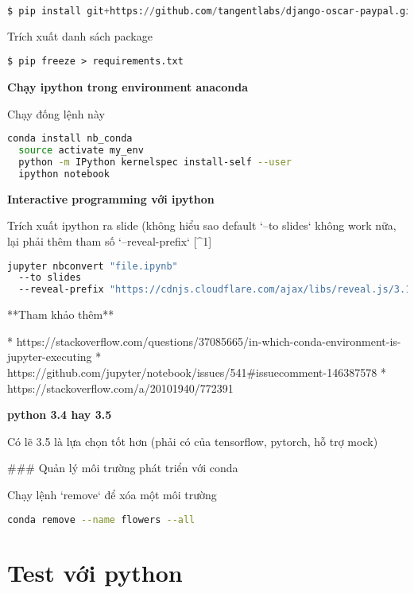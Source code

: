 \begin{lstlisting}[language=Python]
$ pip install git+https://github.com/tangentlabs/django-oscar-paypal.git@issue/34/oscar-0.6#egg=django-oscar-paypal
\end{lstlisting}

\noindent Trích xuất danh sách package

\begin{lstlisting}
$ pip freeze > requirements.txt
\end{lstlisting}

\noindent \textbf{Chạy ipython trong environment anaconda}

\noindent Chạy đống lệnh này

\begin{lstlisting}[language=bash]
  conda install nb_conda
  source activate my_env
  python -m IPython kernelspec install-self --user
  ipython notebook
\end{lstlisting}

\noindent \textbf{Interactive programming với ipython}

\noindent Trích xuất ipython ra slide (không hiểu sao default `--to slides` không work nữa, lại phải thêm tham số `--reveal-prefix` [^1]

\begin{lstlisting}[language=bash]
jupyter nbconvert "file.ipynb"
  --to slides
  --reveal-prefix "https://cdnjs.cloudflare.com/ajax/libs/reveal.js/3.1.0"
\end{lstlisting}

**Tham khảo thêm**

* https://stackoverflow.com/questions/37085665/in-which-conda-environment-is-jupyter-executing
* https://github.com/jupyter/notebook/issues/541#issuecomment-146387578
* https://stackoverflow.com/a/20101940/772391

\noindent \textbf{python 3.4 hay 3.5}

Có lẽ 3.5 là lựa chọn tốt hơn (phải có của tensorflow, pytorch, hỗ trợ mock)

### Quản lý môi trường phát triển với conda

Chạy lệnh `remove` để xóa một môi trường

\begin{lstlisting}[language=bash]
conda remove --name flowers --all
\end{lstlisting}

\section{Test với python}

